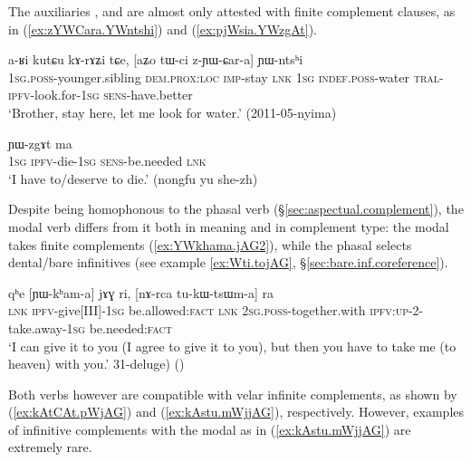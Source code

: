 The auxiliaries ,  and  are almost only attested with finite complement clauses, as in (\ref{ex:zYWCara.YWntshi}) and (\ref{ex:pjWsia.YWzgAt}).

\begin{exe} 
\ex \label{ex:zYWCara.YWntshi}
\gll a-ʁi kutɕu kɤ-rɤʑi tɕe, [aʑo tɯ-ci z-ɲɯ-ɕar-a] ɲɯ-ntsʰi \\
\textsc{1sg}.\textsc{poss}-younger.sibling \textsc{dem}.\textsc{prox}:\textsc{loc} \textsc{imp}-stay \textsc{lnk} \textsc{1sg} \textsc{indef}.\textsc{poss}-water \textsc{tral}-\textsc{ipfv}-look.for-\textsc{1sg} \textsc{sens}-have.better \\
\glt `Brother, stay here, let me look for water.' (2011-05-nyima)
\end{exe} 

\begin{exe} 
\ex \label{ex:pjWsia.YWzgAt}
 ɲɯ-zgɤt ma \\
\textsc{1sg} \textsc{ipfv}-die-\textsc{1sg} \textsc{sens}-be.needed \textsc{lnk} \\
\glt `I have to/deserve to die.' (nongfu yu she-zh)
\end{exe} 


Despite being homophonous to the phasal verb  (§\ref{sec:aspectual.complement}), the modal verb   differs from it both in meaning and in complement type: the modal  takes finite complements (\ref{ex:YWkhama.jAG2}), while the phasal  selects dental/bare infinitives (see example \ref{ex:Wti.tojAG}, §\ref{sec:bare.inf.coreference}).

\begin{exe} 
\ex \label{ex:YWkhama.jAG2}
\gll qʰe [ɲɯ-kʰam-a] jɤɣ ri, [nɤ-rca tu-kɯ-tsɯm-a] ra \\
\textsc{lnk} \textsc{ipfv}-give[III]-\textsc{1sg} be.allowed:\textsc{fact} \textsc{lnk} \textsc{2sg}.\textsc{poss}-together.with \textsc{ipfv}:\textsc{up}-2\fl{}-take.away-\textsc{1sg} be.needed:\textsc{fact} \\
\glt `I can give it to you (I agree to give it to you), but then you have to take me (to heaven) with you.' 31-deluge)
()
\end{exe} 

Both verbs however are compatible with velar infinite complements, as shown by (\ref{ex:kAtCAt.pWjAG}) and (\ref{ex:kAstu.mWjjAG}), respectively. However, examples of infinitive complements with the modal  as in (\ref{ex:kAstu.mWjjAG}) are extremely rare.

